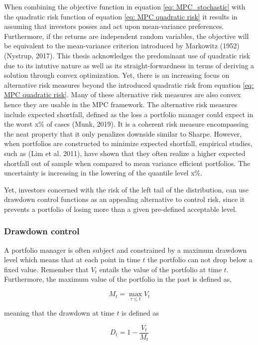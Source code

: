 When combining the objective function in equation \ref{eq: MPC_stochastic} with the quadratic risk function of equation \ref{eq: MPC quadratic risk} it results in assuming that investors posses and act upon mean-variance preferences. Furthermore, if the returns are independent random variables, the objective will be equivalent to the mean-variance criterion introduced by Markowitz (1952) (Nystrup, 2017). This thesis acknowledges the predominant use of quadratic risk due to its intutive nature as well as its straight-forwardness in terms of deriving a solution through convex optimization. Yet, there is an increasing focus on alternative risk measures beyond the introduced quadratic risk from equation \ref{eq: MPC quadratic risk}. Many of these alternative risk measures are also convex hence they are usable in the MPC framework. The alternative risk measures include expected shortfall, defined as the loss a portfolio manager could expect in the worst x\% of cases (Munk, 2019). It is a coherent risk measure encompassing the neat property that it only penalizes downside similar to Sharpe. However, when portfolios are constructed to minimize expected shortfall, empirical studies, such as (Lim et al. 2011), have shown that they often realize a higher expected shortfall out of sample when compared to mean variance efficient portfolios. The uncertainty is increasing in the lowering of the quantile level x\%. 

Yet, investors concerned with the risk of the left tail of the distribution, can use drawdown control functions as an appealing alternative to control risk, since it prevents a portfolio of losing more than a given pre-defined acceptable level. 

\subsubsection{Drawdown control}
A portfolio manager is often subject and constrained by a maximum drawdown level which means that at each point in time $t$ the portfolio can not drop below a fixed value. Remember that $V_t$ entails the value of the portfolio at time $t$. Furthermore, the maximum value of the portfolio in the past is defined as,

\begin{equation}
    M_t = \max_{\tau \leq t} V_t
\end{equation}

meaning that the drawdown at time $t$ is defined as 

\begin{equation}
    D_t = 1 - \frac{V_t}{M_t}
\end{equation}

